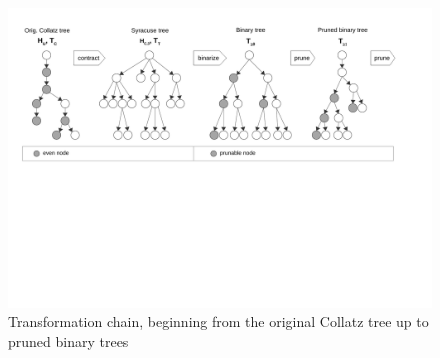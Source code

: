 \begin{figure}[H]
	\includegraphics[trim=1.1cm 10cm 2.6cm 0.2cm, 
	width=1.00\textwidth,page=1]{figures/tree_transformations.pdf}
	\caption{Transformation chain, beginning from the original Collatz tree up to pruned binary trees}
	\label{fig:tree_transformations}
\end{figure}
